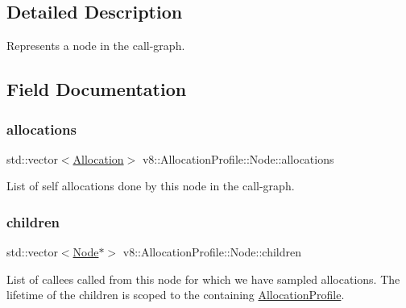 \subsection{Detailed Description}
Represents a node in the call-\/graph. 

\subsection{Field Documentation}
\mbox{\label{structv8_1_1AllocationProfile_1_1Node_a6ee0934b35ba77fb5d8b53f02d5a3068}} 
\subsubsection{\texorpdfstring{allocations}{allocations}}
{\footnotesize\ttfamily std\+::vector$<$\mbox{\hyperlink{structv8_1_1AllocationProfile_1_1Allocation}{Allocation}}$>$ v8\+::\+Allocation\+Profile\+::\+Node\+::allocations}

List of self allocations done by this node in the call-\/graph. \mbox{\label{structv8_1_1AllocationProfile_1_1Node_a176673c0440cb1baaf7713e14da84db0}} 
\subsubsection{\texorpdfstring{children}{children}}
{\footnotesize\ttfamily std\+::vector$<$\mbox{\hyperlink{structv8_1_1AllocationProfile_1_1Node}{Node}}$\ast$$>$ v8\+::\+Allocation\+Profile\+::\+Node\+::children}

List of callees called from this node for which we have sampled allocations. The lifetime of the children is scoped to the containing \mbox{\hyperlink{classv8_1_1AllocationProfile}{Allocation\+Profile}}. \mbox{\label{structv8_1_1AllocationProfile_1_1Node_a7cf86acc298428c858673fc1f9dbe305}} 
